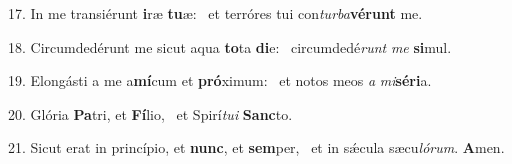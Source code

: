 17. In me transiérunt \textbf{i}ræ \textbf{tu}æ: \ast\  et terróres tui con\textit{tur}\textit{ba}\textbf{vé}\textbf{runt} me.\

18. Circumdedérunt me sicut aqua \textbf{to}ta \textbf{di}e: \ast\  circumdedé\textit{runt} \textit{me} \textbf{si}mul.\

19. Elongásti a me a\textbf{mí}cum et \textbf{pró}ximum: \ast\  et notos meos \textit{a} \textit{mi}\textbf{sé}\textbf{ri}a.\

20. Glória \textbf{Pa}tri, et \textbf{Fí}lio, \ast\  et Spirí\textit{tu}\textit{i} \textbf{Sanc}to.\

21. Sicut erat in princípio, et \textbf{nunc}, et \textbf{sem}per, \ast\  et in sǽcula sæcu\textit{ló}\textit{rum}. \textbf{A}men.\

